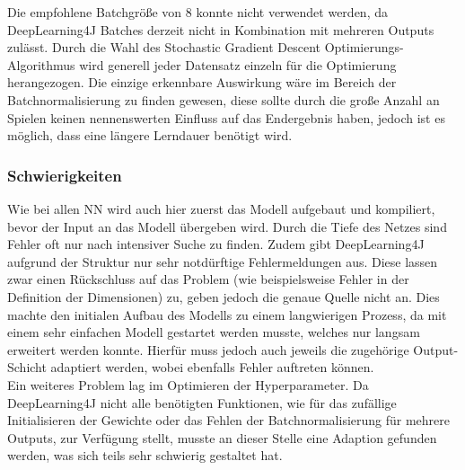 \documentclass[12pt,a4paper]{article}
\begin{document}
Die empfohlene Batchgröße von 8 konnte nicht verwendet werden, da DeepLearning4J Batches derzeit nicht in Kombination mit mehreren Outputs zulässt. Durch die Wahl des Stochastic Gradient Descent Optimierungs-Algorithmus wird generell jeder Datensatz einzeln für die Optimierung herangezogen. Die einzige erkennbare Auswirkung wäre im Bereich der Batchnormalisierung zu finden gewesen, diese sollte durch die große Anzahl an Spielen keinen nennenswerten Einfluss auf das Endergebnis haben, jedoch ist es möglich, dass eine längere Lerndauer benötigt wird. 

\subsubsection{Schwierigkeiten}
Wie bei allen NN wird auch hier zuerst das Modell aufgebaut und kompiliert, bevor der Input an das Modell übergeben wird. Durch die Tiefe des Netzes sind Fehler oft nur nach intensiver Suche zu finden. Zudem gibt DeepLearning4J aufgrund der Struktur nur sehr notdürftige Fehlermeldungen aus. Diese lassen zwar einen Rückschluss auf das Problem (wie beispielsweise Fehler in der Definition der Dimensionen) zu, geben jedoch die genaue Quelle nicht an. Dies machte den initialen Aufbau des Modells zu einem langwierigen Prozess, da mit einem sehr einfachen Modell gestartet werden musste, welches nur langsam erweitert werden konnte. Hierfür muss jedoch auch jeweils die zugehörige Output-Schicht adaptiert werden, wobei ebenfalls Fehler auftreten können.\\
Ein weiteres Problem lag im Optimieren der Hyperparameter. Da DeepLearning4J nicht alle benötigten Funktionen, wie für das zufällige Initialisieren der Gewichte oder das Fehlen der Batchnormalisierung für mehrere Outputs, zur Verfügung stellt, musste an dieser Stelle eine Adaption gefunden werden, was sich teils sehr schwierig gestaltet hat. 


\newpage

\end{document}
